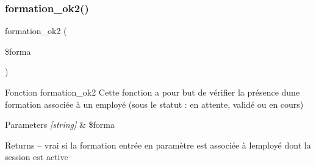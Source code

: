 \subsubsection{formation\+\_\+ok2()}
{\footnotesize\ttfamily formation\+\_\+ok2 (\begin{DoxyParamCaption}\item[{}]{\$forma }\end{DoxyParamCaption})}

Fonction formation\+\_\+ok2 Cette fonction a pour but de vérifier la présence d\textquotesingle{}une formation associée à un employé (sous le statut \+: en attente, validé ou en cours) 
\begin{DoxyParams}{Parameters}
{\em \mbox{[}string\mbox{]}} & \$forma \\
\hline
\end{DoxyParams}
\begin{DoxyReturn}{Returns}
-- vrai si la formation entrée en paramètre est associée à l\textquotesingle{}employé dont la session est active 
\end{DoxyReturn}
